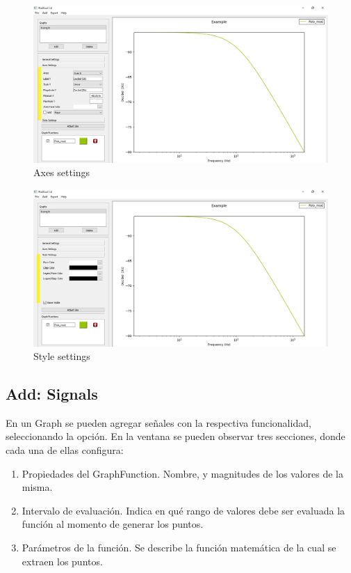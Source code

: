 \documentclass[a4paper,10pt]{article}
\begin{document}
\begin{figure}[H]
\begin{center}
	\includegraphics[scale=0.5]{resources/visor_axes.png}
	\caption{Axes settings}
\end{center}
\end{figure}

\begin{figure}[H]
\begin{center}
	\includegraphics[scale=0.5]{resources/visor_style.png}
	\caption{Style settings}
\end{center}
\end{figure}

\subsection{Add: Signals}
En un Graph se pueden agregar se\~nales con la respectiva funcionalidad,
seleccionando la opci\'on. En la ventana se pueden observar tres secciones, donde cada una de ellas
configura:
\begin{enumerate}
	\item Propiedades del GraphFunction. Nombre, y magnitudes de los valores de la misma.
	\item Intervalo de evaluaci\'on. Indica en qu\'e rango de valores debe ser evaluada la funci\'on al momento de generar los puntos.
	\item Par\'ametros de la funci\'on. Se describe la funci\'on matem\'atica de la cual se extraen los puntos.
\end{enumerate}
\end{document}
